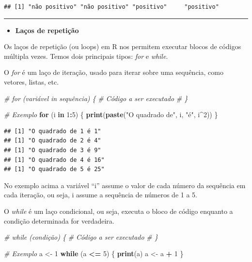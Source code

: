 \documentclass[
]{book}
\newenvironment{Shaded}{\begin{snugshade}}{\end{snugshade}}
\newcommand{\CommentTok}[1]{\textcolor[rgb]{0.56,0.35,0.01}{\textit{#1}}}
\newcommand{\ControlFlowTok}[1]{\textcolor[rgb]{0.13,0.29,0.53}{\textbf{#1}}}
\newcommand{\DecValTok}[1]{\textcolor[rgb]{0.00,0.00,0.81}{#1}}
\newcommand{\FunctionTok}[1]{\textcolor[rgb]{0.13,0.29,0.53}{\textbf{#1}}}
\newcommand{\NormalTok}[1]{#1}
\newcommand{\OtherTok}[1]{\textcolor[rgb]{0.56,0.35,0.01}{#1}}
\newcommand{\SpecialCharTok}[1]{\textcolor[rgb]{0.81,0.36,0.00}{\textbf{#1}}}
\newcommand{\StringTok}[1]{\textcolor[rgb]{0.31,0.60,0.02}{#1}}
\providecommand{\tightlist}{%
  \setlength{\itemsep}{0pt}\setlength{\parskip}{0pt}}
\begin{document}
\begin{verbatim}
## [1] "não positivo" "não positivo" "positivo"     "positivo"
\end{verbatim}

\begin{center}\rule{0.5\linewidth}{0.5pt}\end{center}

\begin{itemize}
\tightlist
\item
  \textbf{Laços de repetição}
\end{itemize}

Os laços de repetição (ou loops) em R nos permitem executar blocos de códigos múltipla vezes. Temos dois principais tipos: \emph{for} e \emph{while}.

O \emph{for} é um laço de iteração, usado para iterar sobre uma sequência, como vetores, listas, etc.

\begin{Shaded}
\begin{Highlighting}[]
\CommentTok{\# for (variável in sequência) \{}
  \CommentTok{\# Código a ser executado}
\CommentTok{\# \}}

\CommentTok{\# Exemplo}
\ControlFlowTok{for}\NormalTok{ (i }\ControlFlowTok{in} \DecValTok{1}\SpecialCharTok{:}\DecValTok{5}\NormalTok{) \{ }
  \FunctionTok{print}\NormalTok{(}\FunctionTok{paste}\NormalTok{(}\StringTok{"O quadrado de"}\NormalTok{, i, }\StringTok{"é"}\NormalTok{, i}\SpecialCharTok{\^{}}\DecValTok{2}\NormalTok{))}
\NormalTok{\}}
\end{Highlighting}
\end{Shaded}

\begin{verbatim}
## [1] "O quadrado de 1 é 1"
## [1] "O quadrado de 2 é 4"
## [1] "O quadrado de 3 é 9"
## [1] "O quadrado de 4 é 16"
## [1] "O quadrado de 5 é 25"
\end{verbatim}

No exemplo acima a variável ``i'' assume o valor de cada número da sequência em cada iteração, ou seja, i assume a sequência de números de 1 a 5.

O \emph{while} é um laço condicional, ou seja, executa o bloco de código enquanto a condição determinada for verdadeira.

\begin{Shaded}
\begin{Highlighting}[]
\CommentTok{\# while (condição) \{}
  \CommentTok{\# Código a ser executado}
\CommentTok{\# \}}

\CommentTok{\# Exemplo}
\NormalTok{a }\OtherTok{\textless{}{-}} \DecValTok{1}
\ControlFlowTok{while}\NormalTok{ (a }\SpecialCharTok{\textless{}=} \DecValTok{5}\NormalTok{) \{}
  \FunctionTok{print}\NormalTok{(a)}
\NormalTok{  a }\OtherTok{\textless{}{-}}\NormalTok{ a }\SpecialCharTok{+} \DecValTok{1}
\NormalTok{\}}
\end{Highlighting}
\end{Shaded}
\end{document}
